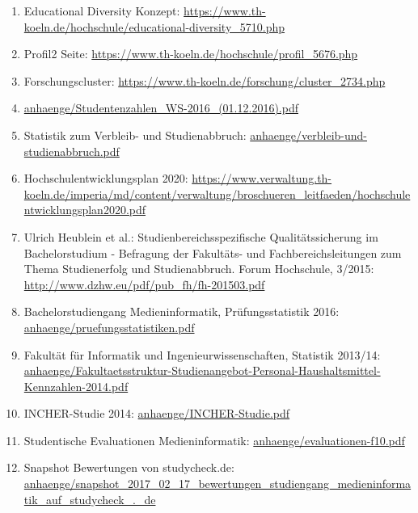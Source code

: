 \documentclass[BCOR12mm,DIV11,titlepage,a4paper,oneside,10pt]{scrbook}
\begin{document}
\begin{enumerate}
\item{Educational Diversity Konzept: \href{https://www.th-koeln.de/hochschule/educational-diversity\_5710.php}{https://www.th-koeln.de/hochschule/educational-diversity\_5710.php} } 
\item{Profil2 Seite: \href{https://www.th-koeln.de/hochschule/profil\_5676.php}{https://www.th-koeln.de/hochschule/profil\_5676.php} } 
\item{Forschungscluster: \href{https://www.th-koeln.de/forschung/cluster\_2734.php}{https://www.th-koeln.de/forschung/cluster\_2734.php} } 
\item{\href{anhaenge/Studentenzahlen\_WS-2016\_(01.12.2016).pdf}{anhaenge/Studentenzahlen\_WS-2016\_(01.12.2016).pdf} } 
\item{Statistik zum Verbleib- und Studienabbruch: \href{anhaenge/verbleib-und-studienabbruch.pdf}{anhaenge/verbleib-und-studienabbruch.pdf} } 
\item{Hochschulentwicklungsplan 2020: \href{https://www.verwaltung.th-koeln.de/imperia/md/content/verwaltung/broschueren\_leitfaeden/hochschulentwicklungsplan2020.pdf}{https://www.verwaltung.th-koeln.de/imperia/md/content/verwaltung/broschueren\_leitfaeden/hochschulentwicklungsplan2020.pdf} } 
\item{Ulrich Heublein et al.: Studienbereichsspezifische Qualitätssicherung im Bachelorstudium - Befragung der Fakultäts- und Fachbereichsleitungen zum Thema Studienerfolg und Studienabbruch. Forum Hochschule, 3/2015: \href{http://www.dzhw.eu/pdf/pub\_fh/fh-201503.pdf}{http://www.dzhw.eu/pdf/pub\_fh/fh-201503.pdf} } 
\item{Bachelorstudiengang Medieninformatik, Prüfungsstatistik 2016: \href{anhaenge/pruefungsstatistiken.pdf}{anhaenge/pruefungsstatistiken.pdf} } 
\item{Fakultät für Informatik und Ingenieurwissenschaften, Statistik 2013/14: \href{anhaenge/Fakultaetsstruktur-Studienangebot-Personal-Haushaltsmittel-Kennzahlen-2014.pdf}{anhaenge/Fakultaetsstruktur-Studienangebot-Personal-Haushaltsmittel-Kennzahlen-2014.pdf} } 
\item{INCHER-Studie 2014: \href{anhaenge/INCHER-Studie.pdf}{anhaenge/INCHER-Studie.pdf} } 
\item{Studentische Evaluationen Medieninformatik: \href{anhaenge/evaluationen-f10.pdf}{anhaenge/evaluationen-f10.pdf} } 
\item{Snapshot Bewertungen von studycheck.de: \href{anhaenge/snapshot\_2017\_02\_17\_bewertungen\_studiengang\_medieninformatik\_auf\_studycheck\_.\_de}{anhaenge/snapshot\_2017\_02\_17\_bewertungen\_studiengang\_medieninformatik\_auf\_studycheck\_.\_de} } 

\end{enumerate}
\end{document}
